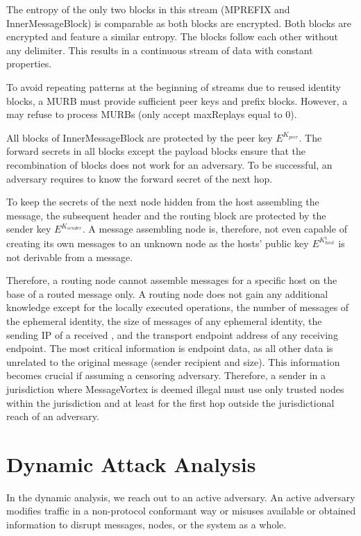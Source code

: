 The entropy of the only two blocks in this stream (MPREFIX and InnerMessageBlock) is comparable as both blocks are encrypted. Both blocks are encrypted and feature a similar entropy. The blocks follow each other without any delimiter. This results in a continuous stream of data with constant properties. 

To avoid repeating patterns at the beginning of streams due to reused identity blocks, a MURB must provide sufficient peer keys and prefix blocks. However, a \VortexNode{} may refuse to process MURBs (only accept maxReplays equal to 0).

All blocks of InnerMessageBlock are protected by the peer key $E^{K_{peer}}$. The forward secrets in all blocks except the payload blocks ensure that the recombination of blocks does not work for an adversary. To be successful, an adversary requires to know the forward secret of the next hop.

To keep the secrets of the next node hidden from the host assembling the message, the subsequent header and the routing block are protected by the sender key $E^{K_{sender}}$. A message assembling node is, therefore, not even capable of creating its own messages to an unknown node as the hosts' public key $E^{K^{1}_{host}}$ is not derivable from a message.

Therefore, a routing node cannot assemble messages for a specific host on the base of a routed message only. A routing node does not gain any additional knowledge except for the locally executed operations, the number of messages of the ephemeral identity, the size of messages of any ephemeral identity, the sending IP of a received \VortexMessage, and the transport endpoint address of any receiving endpoint. The most critical information is endpoint data, as all other data is unrelated to the original message (sender recipient and size). This information becomes crucial if assuming a censoring adversary. Therefore, a sender in a jurisdiction where MessageVortex{} is deemed illegal must use only trusted nodes within the jurisdiction and at least for the first hop outside the jurisdictional reach of an adversary.


\chapter{Dynamic Attack Analysis}\label{sec:dynamicAnalysis}
In the dynamic analysis, we reach out to an active adversary. An active adversary modifies traffic in a non-protocol conformant way or misuses available or obtained information to disrupt messages, nodes, or the system as a whole.

